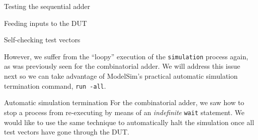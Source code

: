 \documentclass[lab]{course}
\begin{document}
\begin{section}{Testing the sequential adder}
\begin{subsection}{Feeding inputs to the DUT}
\begin{subsubsection}{Self-checking test vectors}
\begin{enumerate}
                However, we suffer from the ``loopy'' execution of the \verb+simulation+ process again, as was previously seen for the combinatorial adder. We will address this issue next so we can take advantage of ModelSim's practical automatic simulation termination command, \verb+run -all+.
            \end{enumerate}
        \end{subsubsection}
    \end{subsection}

    \begin{subsection}{Automatic simulation termination}
        For the combinatorial adder, we saw how to stop a process from re-executing by means of an \emph{indefinite} \verb+wait+ statement. We would like to use the same technique to automatically halt the simulation once all test vectors have gone through the DUT.
    \end{subsection}
\end{section}

\end{document}
